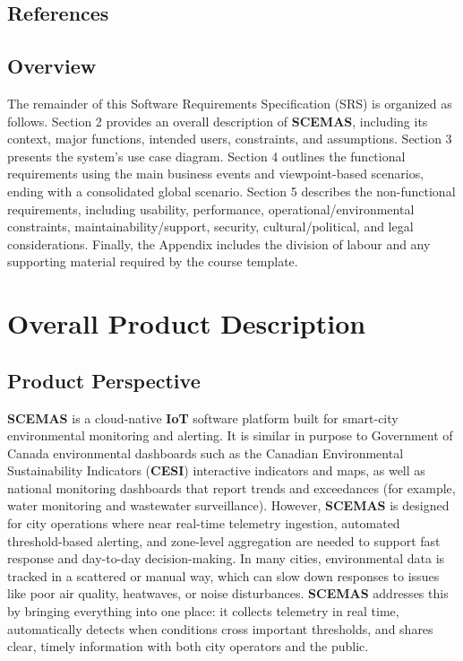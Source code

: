 \documentclass[]{article}
\begin{document}
\subsection{References}
\label{sub:references}

\renewcommand{\refname}{} %
\vspace{-2.5em}



\subsection{Overview}
\label{sub:overview}
The remainder of this Software Requirements Specification (SRS) is organized as follows. Section 2 provides an overall description of \textbf{SCEMAS}, including its context, major functions, intended users, constraints, and assumptions. Section 3 presents the system's use case diagram. Section 4 outlines the functional requirements using the main business events and viewpoint-based scenarios, ending with a consolidated global scenario. Section 5 describes the non-functional requirements, including usability, performance, operational/environmental constraints, maintainability/support, security, cultural/political, and legal considerations. Finally, the Appendix includes the division of labour and any supporting material required by the course template.

\newpage
\section{Overall Product Description}
\label{sec:overall_description}

\subsection{Product Perspective}
\label{sub:product_perspective}

\textbf{SCEMAS} is a cloud-native \textbf{IoT} software platform built for smart-city environmental monitoring and alerting. It is similar in purpose to Government of Canada environmental dashboards such as the Canadian Environmental Sustainability Indicators (\textbf{CESI}) \cite{cesi} interactive indicators and maps, as well as national monitoring dashboards that report trends and exceedances (for example, water monitoring and wastewater surveillance). However, \textbf{SCEMAS} is designed for city operations where near real-time telemetry ingestion, automated threshold-based alerting, and zone-level aggregation are needed to support fast response and day-to-day decision-making. In many cities, environmental data is tracked in a scattered or manual way, which can slow down responses to issues like poor air quality, heatwaves, or noise disturbances. \textbf{SCEMAS} addresses this by bringing everything into one place: it collects telemetry in real time, automatically detects when conditions cross important thresholds, and shares clear, timely information with both city operators and the public.
\end{document}

